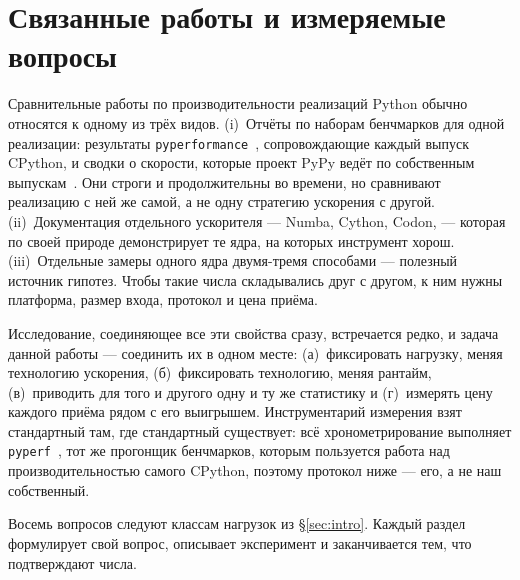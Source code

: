 \documentclass[10pt,a4paper]{article}
\newcommand{\code}[1]{\texttt{\small #1}}
\begin{document}
\section{Связанные работы и измеряемые вопросы}
\label{sec:related}

Сравнительные работы по производительности реализаций Python обычно относятся к одному из трёх
видов. (i)~Отчёты по наборам бенчмарков для одной реализации: результаты
\code{pyperformance}~\cite{pyperformance}, сопровождающие каждый выпуск CPython, и сводки о
скорости, которые проект PyPy ведёт по собственным выпускам~\cite{pypyspeed}. Они строги и продолжительны во
времени, но сравнивают реализацию с ней же самой, а не одну стратегию ускорения с другой. (ii)~Документация отдельного ускорителя --- Numba, Cython,
Codon, --- которая по своей природе демонстрирует те ядра, на которых инструмент хорош.
(iii)~Отдельные замеры одного ядра двумя-тремя способами --- полезный источник гипотез. Чтобы
такие числа складывались друг с другом, к ним нужны платформа, размер входа, протокол и цена
приёма.

Исследование, соединяющее все эти свойства сразу, встречается редко, и задача данной работы ---
соединить их в одном месте: (а)~фиксировать нагрузку, меняя
технологию ускорения, (б)~фиксировать технологию, меняя рантайм, (в)~приводить для того и другого
одну и ту же статистику и (г)~измерять цену каждого приёма рядом с его выигрышем. Инструментарий измерения взят стандартный там, где стандартный существует: всё
хронометрирование выполняет \code{pyperf}~\cite{pyperf}, тот же прогонщик бенчмарков, которым
пользуется работа над производительностью самого CPython, поэтому протокол ниже --- его, а не наш
собственный.

Восемь вопросов следуют классам нагрузок из \S\ref{sec:intro}. Каждый раздел формулирует свой
вопрос, описывает эксперимент и заканчивается тем, что подтверждают числа.
\end{document}
